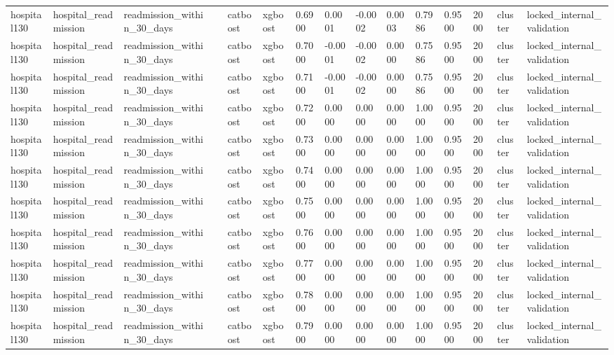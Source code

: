\begin{tabular}{lllllllllllllll}
hospital130 & hospital\_readmission & readmission\_within\_30\_days &  & catboost & xgboost & 0.6900 & 0.0001 & -0.0002 & 0.0003 & 0.7986 & 0.9500 & 2000 & cluster & locked\_internal\_validation \\
hospital130 & hospital\_readmission & readmission\_within\_30\_days &  & catboost & xgboost & 0.7000 & -0.0001 & -0.0002 & 0.0000 & 0.7586 & 0.9500 & 2000 & cluster & locked\_internal\_validation \\
hospital130 & hospital\_readmission & readmission\_within\_30\_days &  & catboost & xgboost & 0.7100 & -0.0001 & -0.0002 & 0.0000 & 0.7586 & 0.9500 & 2000 & cluster & locked\_internal\_validation \\
hospital130 & hospital\_readmission & readmission\_within\_30\_days &  & catboost & xgboost & 0.7200 & 0.0000 & 0.0000 & 0.0000 & 1.0000 & 0.9500 & 2000 & cluster & locked\_internal\_validation \\
hospital130 & hospital\_readmission & readmission\_within\_30\_days &  & catboost & xgboost & 0.7300 & 0.0000 & 0.0000 & 0.0000 & 1.0000 & 0.9500 & 2000 & cluster & locked\_internal\_validation \\
hospital130 & hospital\_readmission & readmission\_within\_30\_days &  & catboost & xgboost & 0.7400 & 0.0000 & 0.0000 & 0.0000 & 1.0000 & 0.9500 & 2000 & cluster & locked\_internal\_validation \\
hospital130 & hospital\_readmission & readmission\_within\_30\_days &  & catboost & xgboost & 0.7500 & 0.0000 & 0.0000 & 0.0000 & 1.0000 & 0.9500 & 2000 & cluster & locked\_internal\_validation \\
hospital130 & hospital\_readmission & readmission\_within\_30\_days &  & catboost & xgboost & 0.7600 & 0.0000 & 0.0000 & 0.0000 & 1.0000 & 0.9500 & 2000 & cluster & locked\_internal\_validation \\
hospital130 & hospital\_readmission & readmission\_within\_30\_days &  & catboost & xgboost & 0.7700 & 0.0000 & 0.0000 & 0.0000 & 1.0000 & 0.9500 & 2000 & cluster & locked\_internal\_validation \\
hospital130 & hospital\_readmission & readmission\_within\_30\_days &  & catboost & xgboost & 0.7800 & 0.0000 & 0.0000 & 0.0000 & 1.0000 & 0.9500 & 2000 & cluster & locked\_internal\_validation \\
hospital130 & hospital\_readmission & readmission\_within\_30\_days &  & catboost & xgboost & 0.7900 & 0.0000 & 0.0000 & 0.0000 & 1.0000 & 0.9500 & 2000 & cluster & locked\_internal\_validation \\

\end{tabular}

